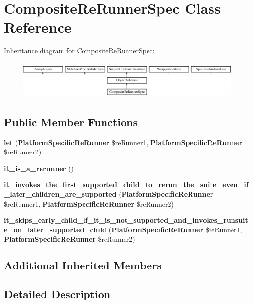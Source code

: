 \section{Composite\+Re\+Runner\+Spec Class Reference}
\label{classspec_1_1_php_spec_1_1_process_1_1_re_runner_1_1_composite_re_runner_spec}
Inheritance diagram for Composite\+Re\+Runner\+Spec\+:\begin{figure}[H]
\begin{center}
\leavevmode
\includegraphics[height=1.953488cm]{classspec_1_1_php_spec_1_1_process_1_1_re_runner_1_1_composite_re_runner_spec}
\end{center}
\end{figure}
\subsection*{Public Member Functions}
\begin{DoxyCompactItemize}
\item 
{\bf let} ({\bf Platform\+Specific\+Re\+Runner} \$re\+Runner1, {\bf Platform\+Specific\+Re\+Runner} \$re\+Runner2)
\item 
{\bf it\+\_\+is\+\_\+a\+\_\+rerunner} ()
\item 
{\bf it\+\_\+invokes\+\_\+the\+\_\+first\+\_\+supported\+\_\+child\+\_\+to\+\_\+rerun\+\_\+the\+\_\+suite\+\_\+even\+\_\+if\+\_\+later\+\_\+children\+\_\+are\+\_\+supported} ({\bf Platform\+Specific\+Re\+Runner} \$re\+Runner1, {\bf Platform\+Specific\+Re\+Runner} \$re\+Runner2)
\item 
{\bf it\+\_\+skips\+\_\+early\+\_\+child\+\_\+if\+\_\+it\+\_\+is\+\_\+not\+\_\+supported\+\_\+and\+\_\+invokes\+\_\+runsuite\+\_\+on\+\_\+later\+\_\+supported\+\_\+child} ({\bf Platform\+Specific\+Re\+Runner} \$re\+Runner1, {\bf Platform\+Specific\+Re\+Runner} \$re\+Runner2)
\end{DoxyCompactItemize}
\subsection*{Additional Inherited Members}


\subsection{Detailed Description}


